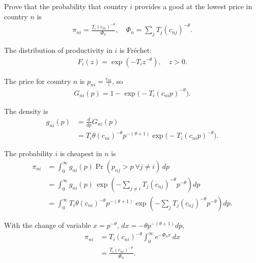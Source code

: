 Prove that the probability that country $i$ provides a good at the lowest price in country $n$ is
\begin{align*}
\pi_{ni} = \frac{T_i (c_{ni})^{-\theta}}{\Phi_n}, \quad
\Phi_n = \sum_j T_j (c_{nj})^{-\theta}.
\end{align*}

\begin{solution}
The distribution of productivity in $i$ is Fréchet:
\begin{align*}
F_i(z) = \exp(-T_i z^{-\theta}), \quad z > 0.
\end{align*}

The price for country $n$ is $p_{ni} = \frac{c_{ni}}{z}$, so
\begin{align*}
G_{ni}(p) = 1 - \exp\!\big(-T_i (c_{ni} p)^{-\theta}\big).
\end{align*}

The density is
\begin{align*}
g_{ni}(p) 
&= \frac{d}{dp} G_{ni}(p) \\
&= T_i \theta (c_{ni})^{-\theta} p^{-(\theta+1)} 
    \exp\!\big(-T_i (c_{ni} p)^{-\theta}\big).
\end{align*}

The probability $i$ is cheapest in $n$ is
\begin{align*}
\pi_{ni} &= \int_0^\infty g_{ni}(p) 
    \Pr(p_{nj} > p \ \forall j \neq i)\, dp \\
&= \int_0^\infty g_{ni}(p)\,
    \exp\!\left(-\sum_{j \neq i} T_j (c_{nj})^{-\theta} p^{-\theta}\right) dp \\
&= \int_0^\infty T_i \theta (c_{ni})^{-\theta} p^{-(\theta+1)} 
    \exp\!\left(-\sum_{j} T_j (c_{nj})^{-\theta} p^{-\theta}\right) dp.
\end{align*}

With the change of variable $x = p^{-\theta}$, $dx = -\theta p^{-(\theta+1)} dp$,
\begin{align*}
\pi_{ni} &= T_i (c_{ni})^{-\theta} 
    \int_0^\infty e^{-\Phi_n x} \, dx \\
&= \frac{T_i (c_{ni})^{-\theta}}{\Phi_n}.
\end{align*}
\end{solution}

